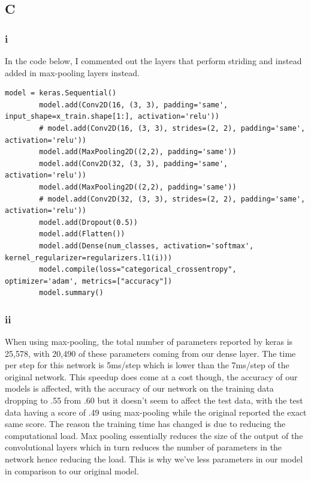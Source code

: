 \documentclass[11pt]{article} %
\begin{document}
\subsection{C}
\subsubsection{i}
In the code below, I commented out the layers that perform striding and instead added in max-pooling layers instead.
\begin{verbatim}
model = keras.Sequential()
        model.add(Conv2D(16, (3, 3), padding='same', input_shape=x_train.shape[1:], activation='relu'))
        # model.add(Conv2D(16, (3, 3), strides=(2, 2), padding='same', activation='relu'))
        model.add(MaxPooling2D((2,2), padding='same'))
        model.add(Conv2D(32, (3, 3), padding='same', activation='relu'))
        model.add(MaxPooling2D((2,2), padding='same'))
        # model.add(Conv2D(32, (3, 3), strides=(2, 2), padding='same', activation='relu'))
        model.add(Dropout(0.5))
        model.add(Flatten())
        model.add(Dense(num_classes, activation='softmax', kernel_regularizer=regularizers.l1(i)))
        model.compile(loss="categorical_crossentropy", optimizer='adam', metrics=["accuracy"])
        model.summary()
\end{verbatim}

\subsubsection{ii}
When using max-pooling, the total number of parameters reported by keras is 25,578, with 20,490 of these parameters coming from our dense layer.  The time per step for this network is 5ms/step which is lower than the 7ms/step of the original network. This speedup does come at a cost though, the accuracy of our models is affected, with the accuracy of our network on the training data dropping to .55 from .60 but it doesn't seem to affect the test data, with the test data having a score of .49 using max-pooling while the original reported the exact same score.  The reason the training time has changed is due to reducing the computational load. Max pooling essentially reduces the size of the output of the convolutional layers which in turn reduces the number of parameters in the network hence reducing the load. This is why we've less parameters in our model in comparison to our original model.
\end{document}
